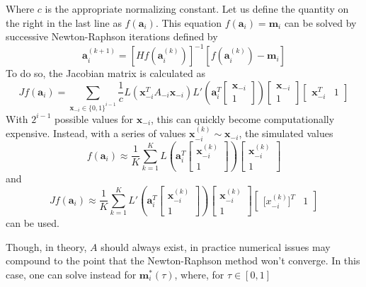 \documentclass[11pt]{article}
\theoremstyle{definition}
\begin{document}
            Where $c$ is the appropriate normalizing constant. Let us define the quantity on the right in the last line as $f(\mathbf a_i)$. This equation $f(\mathbf a_i)=\mathbf{m}_i$ can be solved by successive Newton-Raphson iterations defined by 
            \[\mathbf a_i^{(k+1)} = \left[H f\left(\mathbf a_i^{(k)}\right)\right]^{-1}\left[f\left(\mathbf a_i^{(k)}\right)-\mathbf m_i\right] \]
            To do so, the Jacobian matrix is calculated as 
        \[ J f\left(\mathbf a_i\right) = \sum_{\mathbf x_{-i} \in \{0,1\}^{i-1}} \frac{1}{c}L \left(\mathbf x_{-i}^TA_{-i}\mathbf x_{-i}\right) L'\left(\mathbf{a}_i^T\left[\begin{array}{c} \mathbf x_{-i} \\ 1 \end{array}\right]\right)\left[\begin{array}{c} \mathbf x_{-i} \\ 1 \end{array}\right]\left[\begin{array}{cc} \mathbf x_{-i}^T & 1 \end{array}\right] \]
            With $2^{i-1}$ possible values for $\mathbf x_{-i}$, this can quickly become computationally expensive. Instead, with a series of values $\mathbf x_{-i}^{(k)}\sim \mathbf x_{-i}$, the simulated values 
            \[f\left(\mathbf a_i\right) \approx \frac{1}{K}\sum_{k=1}^K L\left(\mathbf{a}_i^T\left[\begin{array}{c} \mathbf x_{-i}^{(k)} \\ 1 \end{array}\right]\right)\left[\begin{array}{c} \mathbf x_{-i}^{(k)} \\ 1 \end{array}\right] \]
            and
            \[J f\left(\mathbf a_i\right) \approx \frac{1}{K}\sum_{k=1}^K L'\left(\mathbf{a}_i^T\left[\begin{array}{c} \mathbf x_{-i}^{(k)} \\ 1 \end{array}\right]\right)\left[\begin{array}{c} \mathbf x_{-i}^{(k)} \\ 1 \end{array}\right]\left[\begin{array}{cc} \mathbf [x_{-i}^{(k)}]^T & 1 \end{array}\right] \]
            can be used. \par
            Though, in theory, $A$ should always exist, in practice numerical issues may compound to the point that the Newton-Raphson method won't converge. In this case, one can solve instead for $\mathbf m_i^*(\tau)$, where, for $\tau\in[0,1]$
\end{document}
